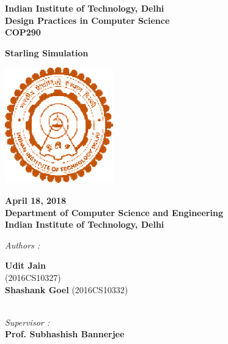 \documentclass[12pt]{report}
\begin{document}
\begin{center}
\LARGE{\textbf{Indian Institute of Technology, Delhi}}\\
\vspace{0.8cm}
\large{\textbf{Design Practices in Computer Science}}\\[5pt]
\large{\textbf{COP290}}\\[5pt]

\vspace{0.5cm}

\large{\textbf{Starling Simulation }}

\begin{center}
\includegraphics[height=5cm]{iitd.eps}
\end{center}
\vspace{0.2cm}

\textbf{April 18, 2018} \\
\textbf{Department of Computer Science and Engineering} \\
\textbf{Indian Institute of Technology, Delhi}\\


\vspace{1.5cm}

\begin{multicols*}{2}

\begin{flushleft}

\textit{Authors :\\ }


\textbf{Udit Jain} \\
(2016CS10327)\\
\textbf{Shashank Goel}
(2016CS10332)\\

\end{flushleft}


\columnbreak

\begin{flushleft}

\textit{\\Supervisor :\\ }
\textbf{Prof. Subhashish Bannerjee} \\[5pt]

\end{flushleft}

\end{multicols*}

\end{center}
\end{document}

